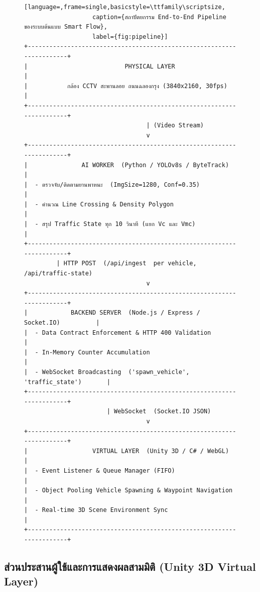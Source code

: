 \documentclass[12pt,a4paper]{report}
\begin{document}
\begin{figure}[H]
\begin{lstlisting}[language=,frame=single,basicstyle=\ttfamily\scriptsize,
                   caption={สถาปัตยกรรม End-to-End Pipeline ของระบบต้นแบบ Smart Flow},
                   label={fig:pipeline}]
+----------------------------------------------------------------------+
|                           PHYSICAL LAYER                             |
|           กล้อง CCTV สะพานลอย ถนนฉลองกรุง (3840x2160, 30fps)        |
+----------------------------------------------------------------------+
                                  | (Video Stream)
                                  v
+----------------------------------------------------------------------+
|               AI WORKER  (Python / YOLOv8s / ByteTrack)             |
|  - ตรวจจับ/ติดตามยานพาหนะ  (ImgSize=1280, Conf=0.35)                |
|  - คำนวณ Line Crossing & Density Polygon                             |
|  - สรุป Traffic State ทุก 10 วินาที (แยก Vc และ Vmc)                |
+----------------------------------------------------------------------+
         | HTTP POST  (/api/ingest  per vehicle, /api/traffic-state)
                                  v
+----------------------------------------------------------------------+
|            BACKEND SERVER  (Node.js / Express / Socket.IO)          |
|  - Data Contract Enforcement & HTTP 400 Validation                  |
|  - In-Memory Counter Accumulation                                   |
|  - WebSocket Broadcasting  ('spawn_vehicle', 'traffic_state')       |
+----------------------------------------------------------------------+
                       | WebSocket  (Socket.IO JSON)
                                  v
+----------------------------------------------------------------------+
|                  VIRTUAL LAYER  (Unity 3D / C# / WebGL)             |
|  - Event Listener & Queue Manager (FIFO)                            |
|  - Object Pooling Vehicle Spawning & Waypoint Navigation            |
|  - Real-time 3D Scene Environment Sync                              |
+----------------------------------------------------------------------+
\end{lstlisting}
\end{figure}

\subsection{ส่วนประสานผู้ใช้และการแสดงผลสามมิติ (Unity 3D Virtual Layer)}
\label{subsec:unity}
\end{document}
